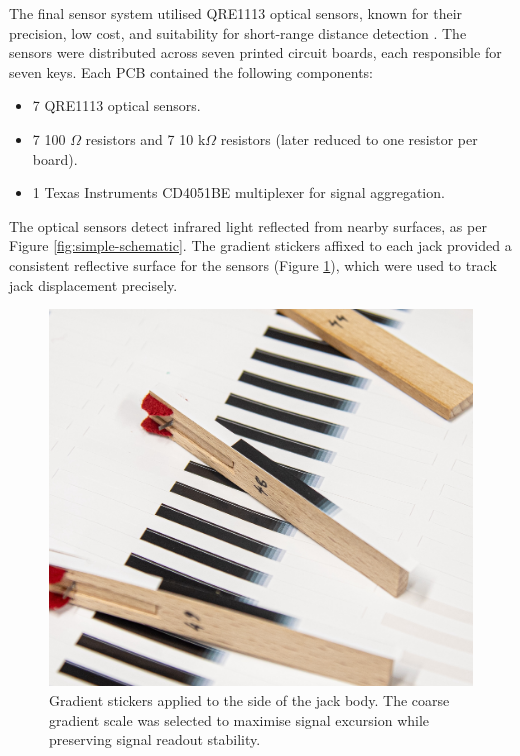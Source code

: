 The final sensor system utilised QRE1113 optical sensors, known for their precision, low cost, and suitability for short-range distance detection \cite{McPherson2013, McPherson2019}. The sensors were distributed across seven printed circuit boards, each responsible for seven keys. Each PCB contained the following components:

\begin{itemize}
    \item 7 QRE1113 optical sensors.
    \item 7 100 $\Omega$ resistors and 7 10 k$\Omega$ resistors (later reduced to one resistor per board).
    \item 1 Texas Instruments CD4051BE multiplexer for signal aggregation.
\end{itemize}

The optical sensors detect infrared light reflected from nearby surfaces, as per Figure \ref{fig:simple-schematic}. The gradient stickers affixed to each jack provided a consistent reflective surface for the sensors (Figure \ref{fig:jack-tags}), which were used to track jack displacement precisely. 

\begin{figure}  
  \centering
  \includegraphics[width=\linewidth]{src/images/tagging-jacks-3.jpg} 
  \caption{Gradient stickers applied to the side of the jack body. The coarse gradient scale was selected to maximise signal excursion while preserving signal readout stability.}
  \Description{} 
  \label{fig:jack-tags}
\end{figure}


